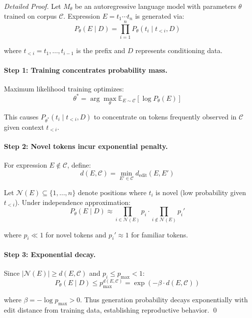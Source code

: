 \begin{proof}[Detailed Proof]
Let $M_\theta$ be an autoregressive language model with parameters $\theta$ trained on corpus $\mathcal{C}$. Expression $E = t_1 \cdots t_n$ is generated via:
\[
P_\theta(E \mid D) = \prod_{i=1}^n P_\theta(t_i \mid t_{<i}, D)
\]

where $t_{<i} = t_1, \ldots, t_{i-1}$ is the prefix and $D$ represents conditioning data.

\paragraph{Step 1: Training concentrates probability mass.}

Maximum likelihood training optimizes:
\[
\theta^* = \arg\max_\theta \mathbb{E}_{E \sim \mathcal{C}}[\log P_\theta(E)]
\]

This causes $P_{\theta^*}(t_i \mid t_{<i}, D)$ to concentrate on tokens frequently observed in $\mathcal{C}$ given context $t_{<i}$.

\paragraph{Step 2: Novel tokens incur exponential penalty.}

For expression $E \notin \mathcal{C}$, define:
\[
d(E, \mathcal{C}) = \min_{E' \in \mathcal{C}} d_{\text{edit}}(E, E')
\]

Let $\mathcal{N}(E) \subseteq \{1, \ldots, n\}$ denote positions where $t_i$ is novel (low probability given $t_{<i}$). Under independence approximation:
\[
P_\theta(E \mid D) \approx \prod_{i \in \mathcal{N}(E)} p_i \cdot \prod_{i \notin \mathcal{N}(E)} p_i'
\]

where $p_i \ll 1$ for novel tokens and $p_i' \approx 1$ for familiar tokens.

\paragraph{Step 3: Exponential decay.}

Since $|\mathcal{N}(E)| \geq d(E, \mathcal{C})$ and $p_i \leq p_{\max} < 1$:
\[
P_\theta(E \mid D) \leq p_{\max}^{d(E, \mathcal{C})} = \exp(-\beta \cdot d(E, \mathcal{C}))
\]

where $\beta = -\log p_{\max} > 0$. Thus generation probability decays exponentially with edit distance from training data, establishing reproductive behavior. \qed
\end{proof}

